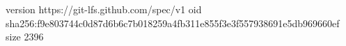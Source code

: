 version https://git-lfs.github.com/spec/v1
oid sha256:f9e803744c0d87d6b6c7b018259a4fb311e855f3e3f557938691e5db969660ef
size 2396
